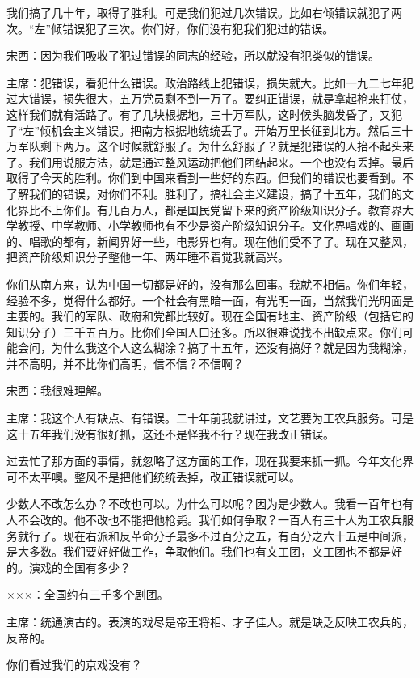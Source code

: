 我们搞了几十年，取得了胜利。可是我们犯过几次错误。比如右倾错误就犯了两次。“左”倾错误犯了三次。你们好，你们没有犯我们犯过的错误。

宋西：因为我们吸收了犯过错误的同志的经验，所以就没有犯类似的错误。

主席：犯错误，看犯什么错误。政治路线上犯错误，损失就大。比如一九二七年犯过大错误，损失很大，五万党员剩不到一万了。要纠正错误，就是拿起枪来打仗，这样我们就有活路了。有了几块根据地，三十万军队，这时候头脑发昏了，又犯了“左”倾机会主义错误。把南方根据地统统丢了。开始万里长征到北方。然后三十万军队剩下两万。这个时候就舒服了。为什么舒服了？就是犯错误的人抬不起头来了。我们用说服方法，就是通过整风运动把他们团结起来。一个也没有丢掉。最后取得了今天的胜利。你们到中国来看到一些好的东西。但我们的错误也要看到。不了解我们的错误，对你们不利。胜利了，搞社会主义建设，搞了十五年，我们的文化界比不上你们。有几百万人，都是国民党留下来的资产阶级知识分子。教育界大学教授、中学教师、小学教师也有不少是资产阶级知识分子。文化界唱戏的、画画的、唱歌的都有，新闻界好一些，电影界也有。现在他们受不了了。现在又整风，把资产阶级知识分子整他一年、两年睡不着觉我就高兴。

你们从南方来，认为中国一切都是好的，没有那么回事。我就不相信。你们年轻，经验不多，觉得什么都好。一个社会有黑暗一面，有光明一面，当然我们光明面是主要的。我们的军队、政府和党都比较好。现在全国有地主、资产阶级（包括它的知识分子）三千五百万。比你们全国人口还多。所以很难说找不出缺点来。你们可能会问，为什么我这个人这么糊涂？搞了十五年，还没有搞好？就是因为我糊涂，并不高明，并不比你们高明，信不信？不信啊？

宋西：我很难理解。

主席：我这个人有缺点、有错误。二十年前我就讲过，文艺要为工农兵服务。可是这十五年我们没有很好抓，这还不是怪我不行？现在我改正错误。

过去忙了那方面的事情，就忽略了这方面的工作，现在我要来抓一抓。今年文化界可不太平噢。整风不是把他们统统丢掉，改正错误就可以。

少数人不改怎么办？不改也可以。为什么可以呢？因为是少数人。我看一百年也有人不会改的。他不改也不能把他枪毙。我们如何争取？一百人有三十人为工农兵服务就行了。现在右派和反革命分子最多不过百分之五，有百分之六十五是中间派，是大多数。我们要好好做工作，争取他们。我们也有文工团，文工团也不都是好的。演戏的全国有多少？

×××：全国约有三千多个剧团。

主席：统通演古的。表演的戏尽是帝王将相、才子佳人。就是缺乏反映工农兵的，反帝的。

你们看过我们的京戏没有？

